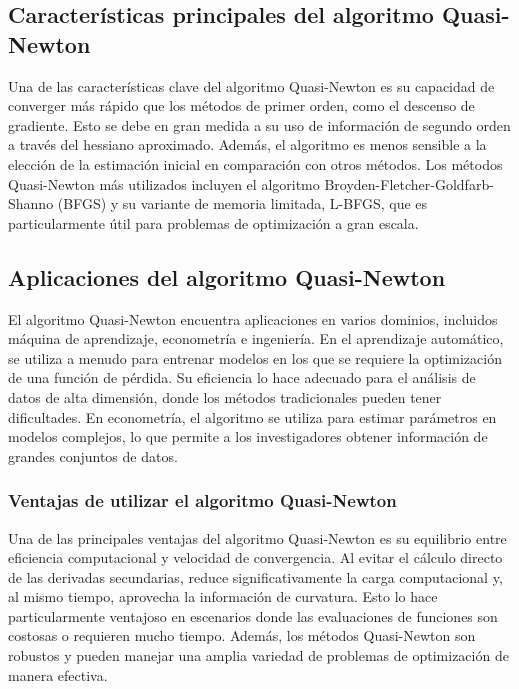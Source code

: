 \documentclass{article}
\begin{document}
	\subsection{Características principales del algoritmo Quasi-Newton}
	
	Una de las características clave del algoritmo Quasi-Newton es su capacidad de converger más rápido que los métodos de primer orden, como el descenso de gradiente. Esto se debe en gran medida a su uso de información de segundo orden a través del hessiano aproximado. Además, el algoritmo es menos sensible a la elección de la estimación inicial en comparación con otros métodos. Los métodos Quasi-Newton más utilizados incluyen el algoritmo Broyden-Fletcher-Goldfarb-Shanno (BFGS) y su variante de memoria limitada, L-BFGS, que es particularmente útil para problemas de optimización a gran escala.
	
	\subsection{Aplicaciones del algoritmo Quasi-Newton}
	
	El algoritmo Quasi-Newton encuentra aplicaciones en varios dominios, incluidos máquina de aprendizaje, econometría e ingeniería. En el aprendizaje automático, se utiliza a menudo para entrenar modelos en los que se requiere la optimización de una función de pérdida. Su eficiencia lo hace adecuado para el análisis de datos de alta dimensión, donde los métodos tradicionales pueden tener dificultades. En econometría, el algoritmo se utiliza para estimar parámetros en modelos complejos, lo que permite a los investigadores obtener información de grandes conjuntos de datos.
	
	\subsubsection{Ventajas de utilizar el algoritmo Quasi-Newton}
	
	Una de las principales ventajas del algoritmo Quasi-Newton es su equilibrio entre eficiencia computacional y velocidad de convergencia. Al evitar el cálculo directo de las derivadas secundarias, reduce significativamente la carga computacional y, al mismo tiempo, aprovecha la información de curvatura. Esto lo hace particularmente ventajoso en escenarios donde las evaluaciones de funciones son costosas o requieren mucho tiempo. Además, los métodos Quasi-Newton son robustos y pueden manejar una amplia variedad de problemas de optimización de manera efectiva.
	
\end{document}
